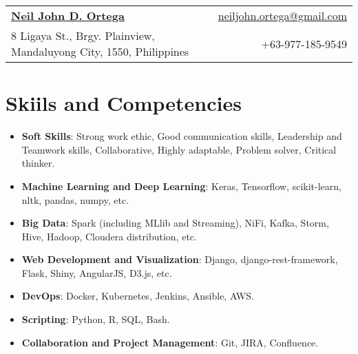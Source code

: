 \documentclass[letterpaper,11pt]{article}
\newcommand{\resumeItemInline}[2]{
  \item\small{
    \textbf{#1}{: #2 \vspace{-2pt}}
  }
}
\newcommand{\resumeSubItemInline}[2]{\resumeItemInline{#1}{#2}\vspace{-6pt}}
\newcommand{\resumeSubHeadingListStart}{\begin{itemize}[leftmargin=*]}
\newcommand{\resumeSubHeadingListEnd}{\end{itemize}\vspace{-5pt}}
\begin{document}
\begin{tabular*}{\textwidth}{l@{\extracolsep{\fill}}r}
  \textbf{\href{https://www.linkedin.com/in/neiljdo/}{\Large Neil John D. Ortega}} & \href{mailto:neiljohn.ortega@gmail.com}{neiljohn.ortega@gmail.com}\\
  8 Ligaya St., Brgy. Plainview, Mandaluyong City, 1550, Philippines & +63-977-185-9549\\
\end{tabular*}


\section{Skiils and Competencies}
  \resumeSubHeadingListStart
    \resumeSubItemInline{Soft Skills}
      {Strong work ethic, Good communication skills, Leadership and Teamwork skills, Collaborative, Highly adaptable, Problem solver, Critical thinker.}
    \resumeSubItemInline{Machine Learning and Deep Learning}
      {Keras, Tensorflow, scikit-learn, nltk, pandas, numpy, etc.}
    \resumeSubItemInline{Big Data}
      {Spark (including MLlib and Streaming), NiFi, Kafka, Storm, Hive, Hadoop, Cloudera distribution, etc.}
    \resumeSubItemInline{Web Development and Visualization}
      {Django, django-rest-framework, Flask, Shiny, AngularJS, D3.js, etc.}
    \resumeSubItemInline{DevOps}
      {Docker, Kubernetes, Jenkins, Ansible, AWS.}
    \resumeSubItemInline{Scripting}
      {Python, R, SQL, Bash.}
    \resumeSubItemInline{Collaboration and Project Management}
      {Git, JIRA, Confluence.}
  \resumeSubHeadingListEnd


\end{document}
